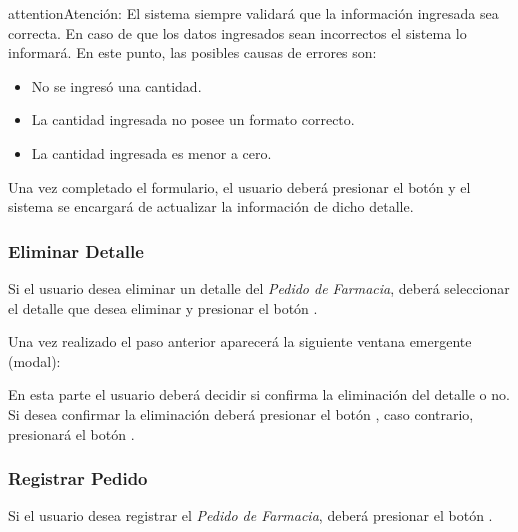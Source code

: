 \documentclass[a4paper,10pt,spanish]{sphinxmanual}
\begin{document}
\begin{notice}{attention}{Atención:}
El sistema siempre validará que la información ingresada sea correcta. En caso de que los datos ingresados sean incorrectos el sistema lo informará.
En este punto, las posibles causas de errores son:
\begin{itemize}
\item {} 
No se ingresó una cantidad.

\item {} 
La cantidad ingresada no posee un formato correcto.

\item {} 
La cantidad ingresada es menor a cero.

\end{itemize}
\end{notice}

Una vez completado el formulario, el usuario deberá presionar el botón  y el sistema se encargará de actualizar la información de dicho detalle.


\subsubsection{Eliminar Detalle}
\label{pedidosfarmacia:eliminar-detalle-pf}\label{pedidosfarmacia:eliminar-detalle}
Si el usuario desea eliminar un detalle del \emph{Pedido de Farmacia}, deberá seleccionar el detalle que desea eliminar y presionar el botón .


Una vez realizado el paso anterior aparecerá la siguiente ventana emergente (modal):


En esta parte el usuario deberá decidir si confirma la eliminación del detalle o no. Si desea confirmar la eliminación deberá presionar el botón , caso contrario, presionará el botón .


\subsubsection{Registrar Pedido}
\label{pedidosfarmacia:registrar-pedido}\label{pedidosfarmacia:registrar-pedido-pf}
Si el usuario desea registrar el \emph{Pedido de Farmacia}, deberá presionar el botón .
\end{document}
